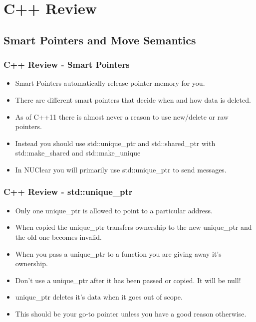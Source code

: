 \documentclass{beamer}
\begin{document}
\section{C++ Review}
\subsection{Smart Pointers and Move Semantics}
\begin{frame}
	\frametitle{C++ Review - Smart Pointers}
	\begin{itemize}
		\item Smart Pointers automatically release pointer memory for you.
		\item There are different smart pointers that decide when and how data is deleted.
		\item As of C++11 there is almost never a reason to use new/delete or raw pointers.
		\item Instead you should use std::unique\_ptr and std::shared\_ptr with std::make\_shared and std::make\_unique
		\item In NUClear you will primarily use std::unique\_ptr to send messages.
	\end{itemize}
\end{frame}

\begin{frame}
	\frametitle{C++ Review - std::unique\_ptr}
	\begin{itemize}
		\item Only one unique\_ptr is allowed to point to a particular address.
		\item When copied the unique\_ptr transfers ownership to the new unique\_ptr and the old one becomes invalid.
		\item When you pass a unique\_ptr to a function you are giving away it's ownership.
		\item Don't use a unique\_ptr after it has been passed or copied. It will be null!
		\item unique\_ptr deletes it's data when it goes out of scope. 
		\item This should be your go-to pointer unless you have a good reason otherwise.
	\end{itemize}
\end{frame}
\end{document}

